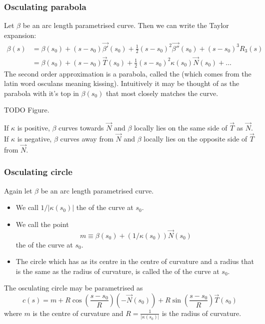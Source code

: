 \subsubsection{Osculating parabola}
Let $\beta$ be an arc length parametrised curve. Then we can write the Taylor expansion:
\begin{align*}
\beta(s) &= \beta(s_0) + (s-s_0)\vec{\beta'}(s_0) + \frac{1}{2}(s-s_0)^2\vec{\beta''}(s_0) + (s-s_0)^3R_3(s) \\
&= \beta(s_0) + (s-s_0)\vec{T}(s_0) + \frac{1}{2}(s-s_0)^2\kappa(s_0)\vec{N}(s_0) + \ldots
\end{align*}
The second order approximation is a parabola, called the  (which comes from the latin word osculans meaning kissing). Intuitively it may be thought of as the parabola with it's top in $\beta(s_0)$ that most closely matches the curve.

TODO Figure. 

If $\kappa$ is positive, $\beta$ curves towards $\vec{N}$ and $\beta$ locally lies on the same side of $\vec{T}$ as $\vec{N}$. If $\kappa$ is negative, $\beta$ curves away from $\vec{N}$ and $\beta$ locally lies on the opposite side of $\vec{T}$ from $\vec{N}$.

\subsubsection{Osculating circle}
Again let $\beta$ be an arc length parametrised curve.
\begin{definition}
\begin{itemize}
\item We call $1/|\kappa(s_0)|$ the  of the curve at $s_0$.
\item We call the point
\[ m \equiv \beta(s_0) + (1/\kappa(s_0))\vec{N}(s_0) \]
the  of the curve at $s_0$.
\item The circle which has as its centre in the centre of curvature and a radius that is the same as the radius of curvature, is called the  of the curve at $s_0$.
\end{itemize}
\end{definition}
The osculating circle may be parametrised as
\[ c(s) = m + R\cos \left(\frac{s-s_0}{R}\right)(- \vec{N}(s_0)) + R\sin \left(\frac{s-s_0}{R}\right)\vec{T}(s_0) \]
where $m$ is the centre of curvature and $R = \frac{1}{|\kappa(s_0)|}$ is the radius of curvature.

